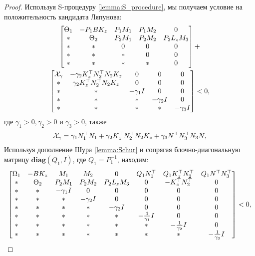 \begin{proof}
	Используя S-процедуру {\ref{lemma:S_procedure}}, мы получаем условие на положительность кандидата Ляпунова:
	\begin{multline}
		\begin{bmatrix}
			{\Theta}_1 & -{P}_1{B}{K}_z & {P}_1{M}_1 & {P}_1{M}_2 &0 \\
			* &    {\Theta}_2 & {P}_2{M}_1 & {P}_2{M}_2 & {P}_2{L}_z{M}_3\\
			* & * & 0 & 0&0\\
			* & * & * & 0&0 \\
			* & * & * & *&0
		\end{bmatrix} + \\
		\begin{bmatrix}
			\mathcal{X}_{\gamma}& -\gamma_2{K}_z^\top{N}_2^\top{N}_2{K}_z &0 &0 & 0\\
			*&\gamma_2{K}_z^\top{N}_2^\top{N}_2{K}_z&0&0&0\\
			*&*&-\gamma_1{I}&0&0\\
			*&*&*&-\gamma_2{I}&0\\
			*&*&*&*&-\gamma_3{I}\\
		\end{bmatrix} 
		<0,
	\end{multline}
	где $\gamma_1 > 0,\gamma_2 > 0$ и $\gamma_3 > 0$, также
	\begin{equation}
		\mathcal{X}_{\gamma}=    \gamma_1{N}_1^\top{N}_1 +\gamma_2{K}_z^\top{N}_2^\top{N}_2{K}_z+\gamma_3{N}^\top{N}_3^\top{N}_3{N},
	\end{equation}
	Используя дополнение Шура {\ref{lemma:Schur}} и сопрягая блочно-диагональную матрицу $\textbf{diag}({Q}_1, {I})$, где ${Q}_1 = {P}_1^{-1}$, находим:
	\begin{equation}
		\label{eq:thm3_before_Young}
		\begin{bmatrix}
			{\Omega}_1 & -{B}{K}_z & {M}_1 & {M}_2 & 0& {Q}_1{N}_1\T & {Q}_1{K}_z\T{N}_2\T & {Q}_1 {N}\T{N}_3\T 
			\\
			* & {\Theta}_2 & {P}_2{M}_1 & {P}_2{M}_2 & {P}_2{L}_z{M}_3 & 0 & -{K}_z\T{N}_2\T & 0\\
			* & * & -\gamma_1{I} & 0&0&0&0&0\\
			* & * & * & -\gamma_2{I}&0&0&0&0\\
			* & * & * & *&-\gamma_3{I}&0&0&0\\
			* & * & * & *&*&-\frac{1}{\gamma_1}{I}&0&0\\
			* & * & * & *&*&*&-\frac{1}{\gamma_2}{I}&0\\
			*&* & * & * & *&*&*&-\frac{1}{\gamma_3}{I}
		\end{bmatrix}<0,

\end{equation}
\end{proof}
